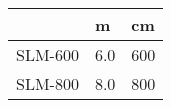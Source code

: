 \documentclass[12pt]{article}
\begin{document}
	
	\renewcommand{\tabcolsep}{12pt}
	\renewcommand{\arraystretch}{1.5}
	\begin{tabular}{ l | l | l }
		\hline
		& m & cm \\ 
		\hline 
		SLM-600 & 6.0 & 600 \\ 
		SLM-800 & 8.0 & 800 \\ 
		\hline
	\end{tabular}
	
\end{document}
